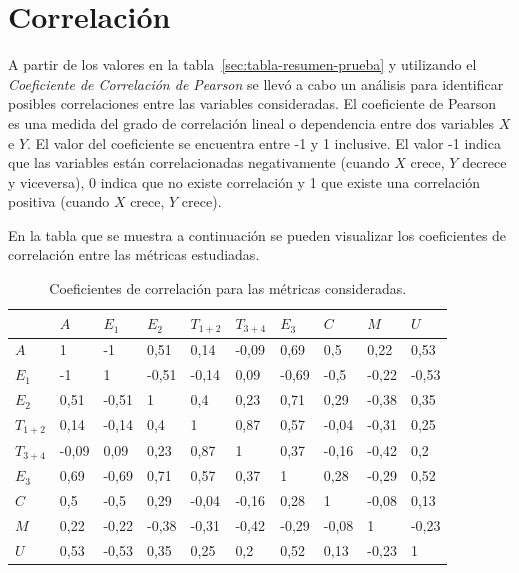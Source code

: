\section{Correlaci\'on}

A partir de los valores en la tabla~\ref{sec:tabla-resumen-prueba} y utilizando el \emph{Coeficiente de 
Correlaci\'on de Pearson}\cite{BoslaughStatistics2008} se llev\'o a cabo un an\'alisis  para identificar posibles
correlaciones entre las variables consideradas. El coeficiente de Pearson es una medida del grado de 
correlaci\'on lineal o dependencia entre dos variables $X$ e $Y$. El valor del coeficiente se encuentra entre
-1 y 1 inclusive. El valor -1 indica que las variables est\'an correlacionadas negativamente 
(cuando $X$ crece, $Y$ decrece y viceversa), 0 indica que no existe correlaci\'on y 1 que existe una correlaci\'on
positiva (cuando $X$ crece, $Y$ crece).

En la tabla que se muestra a continuaci\'on se pueden visualizar los coeficientes de correlaci\'on entre las m\'etricas estudiadas.

\begin{table}[H] 
\centering
\footnotesize
\begin{tabular}{|p{1.2cm}|p{1.2cm}|p{1.2cm}|p{1.2cm}|p{1.2cm}|p{1.2cm}|p{1.2cm}|p{1.2cm}|p{1.2cm}|p{1.2cm}|}
\hline
&  $A$  &   $E_1$ &  $E_2$  &  $T_{1+2}$  & $T_{3+4}$     & $E_3$ & $C$ &  $M$ & $U$ \\
\hline
$A$  &  1  &  -1  &  0,51  &  0,14  &  -0,09  &  0,69  &  0,5  &  0,22  &  0,53 \\
$E_1$  &  -1  &  1  &  -0,51  &  -0,14  &  0,09  &  -0,69  &  -0,5  &  -0,22  &  -0,53 \\
$E_2$  &  0,51  &  -0,51  &  1  &  0,4  &  0,23  &  0,71  &  0,29  &  -0,38  &  0,35  \\
$T_{1+2}$  &  0,14  &  -0,14  &  0,4  &  1  &  0,87  &  0,57  &  -0,04  &  -0,31  &  0,25 \\
$T_{3+4}$  &  -0,09  &  0,09  &  0,23  &  0,87  &  1  &  0,37  &  -0,16  &  -0,42  &  0,2 \\
$E_3$  &  0,69  &  -0,69  &  0,71  &  0,57  &  0,37  &  1  &  0,28  &  -0,29  &  0,52 \\
$C$  &  0,5  &  -0,5  &  0,29  &  -0,04  &  -0,16  &  0,28  &  1  &  -0,08  &  0,13 \\
$M$  &  0,22  &  -0,22  &  -0,38  &  -0,31  &  -0,42  &  -0,29  &  -0,08  &  1  &  -0,23 \\
$U$  &  0,53  &  -0,53  &  0,35  &  0,25  &  0,2  &  0,52  &  0,13  &  -0,23  &  1 \\
\hline
\end{tabular}
\caption{Coeficientes de correlaci\'on para las m\'etricas consideradas.}
\label{sec:tabla-correlacion}
\end{table}

